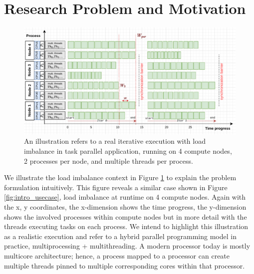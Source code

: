 \section{Research Problem and Motivation}
\label{sec:intro_prob_form_motiv}

\begin{figure}[t]
	\centering
	\includegraphics[scale=0.7]{./pictures/introduction/intro_problem_formulation.pdf}
	\caption{An illustration refers to a real iterative execution with load imbalance in task parallel application, running on 4 compute nodes, 2 processes per node, and multiple threads per process.}
	\label{fig:intro_prob_formulation}
\end{figure}

We illustrate the load imbalance context in Figure \ref{fig:intro_prob_formulation} to explain the problem formulation intuitively. This figure reveals a similar case shown in Figure \ref{fig:intro_usecase}, load imbalance at runtime on 4 compute nodes. Again with the x, y coordinates, the x-dimension shows the time progress, the y-dimension shows the involved processes within compute nodes but in more detail with the threads executing tasks on each process. We intend to highlight this illustration as a realistic execution and refer to a hybrid parallel programming model in practice, multiprocessing + multithreading. A modern processor today is mostly multicore architecture; hence, a process mapped to a processor can create multiple threads pinned to multiple corresponding cores within that processor.\\


